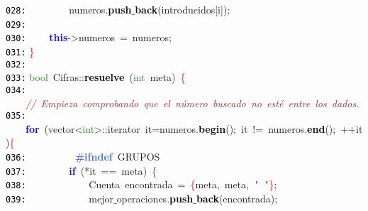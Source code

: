 \documentclass[a4paper,10pt]{scrartcl}
\begin{document}
{   \mbox{}\texttt{\textcolor{Black}{028:}} \ \ \ \ \ \ \ \ numeros\textcolor{BrickRed}{.}\textbf{\textcolor{Black}{push$\_$back}}\textcolor{BrickRed}{(}introducidos\textcolor{BrickRed}{[}i\textcolor{BrickRed}{]);} \\
   \mbox{}\texttt{\textcolor{Black}{029:}} \ \  \\
   \mbox{}\texttt{\textcolor{Black}{030:}} \ \ \ \ \textbf{\textcolor{Blue}{this}}\textcolor{BrickRed}{-\textgreater{}}numeros\ \textcolor{BrickRed}{=}\ numeros\textcolor{BrickRed}{;} \\
   \mbox{}\texttt{\textcolor{Black}{031:}} \textcolor{Red}{\}} \\
   \mbox{}\texttt{\textcolor{Black}{032:}}  \\
   \mbox{}\texttt{\textcolor{Black}{033:}} \textcolor{ForestGreen}{bool}\ Cifras\textcolor{BrickRed}{::}\textbf{\textcolor{Black}{resuelve}}\ \textcolor{BrickRed}{(}\textcolor{ForestGreen}{int}\ meta\textcolor{BrickRed}{)}\ \textcolor{Red}{\{} \\
   \mbox{}\texttt{\textcolor{Black}{034:}} \ \ \ \ \textit{\textcolor{Brown}{//\ Empieza\ comprobando\ que\ el\ número\ buscado\ no\ esté\ entre\ los\ dados.}} \\
   \mbox{}\texttt{\textcolor{Black}{035:}} \ \ \ \ \textbf{\textcolor{Blue}{for}}\ \textcolor{BrickRed}{(}vector\textcolor{BrickRed}{\textless{}}\textcolor{ForestGreen}{int}\textcolor{BrickRed}{\textgreater{}::}\textcolor{TealBlue}{iterator}\ it\textcolor{BrickRed}{=}numeros\textcolor{BrickRed}{.}\textbf{\textcolor{Black}{begin}}\textcolor{BrickRed}{();}\ it\ \textcolor{BrickRed}{!=}\ numeros\textcolor{BrickRed}{.}\textbf{\textcolor{Black}{end}}\textcolor{BrickRed}{();}\ \textcolor{BrickRed}{++}it\textcolor{BrickRed}{)}\textcolor{Red}{\{} \\
   \mbox{}\texttt{\textcolor{Black}{036:}} \textbf{\textcolor{RoyalBlue}{\ \ \ \ \ \ \ \ \#ifndef}}\ GRUPOS \\
   \mbox{}\texttt{\textcolor{Black}{037:}} \ \ \ \ \ \ \ \ \textbf{\textcolor{Blue}{if}}\ \textcolor{BrickRed}{(*}it\ \textcolor{BrickRed}{==}\ meta\textcolor{BrickRed}{)}\ \textcolor{Red}{\{} \\
   \mbox{}\texttt{\textcolor{Black}{038:}} \ \ \ \ \ \ \ \ \ \ \ \ \textcolor{TealBlue}{Cuenta}\ encontrada\ \textcolor{BrickRed}{=}\ \textcolor{Red}{\{}meta\textcolor{BrickRed}{,}\ meta\textcolor{BrickRed}{,}\ \texttt{\textcolor{Red}{'\ '}}\textcolor{Red}{\}}\textcolor{BrickRed}{;} \\
   \mbox{}\texttt{\textcolor{Black}{039:}} \ \ \ \ \ \ \ \ \ \ \ \ mejor$\_$operaciones\textcolor{BrickRed}{.}\textbf{\textcolor{Black}{push$\_$back}}\textcolor{BrickRed}{(}encontrada\textcolor{BrickRed}{);} \\
}
\end{document}
